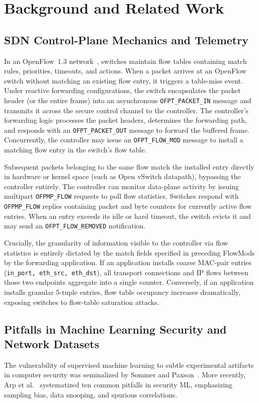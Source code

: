 \documentclass[journal]{IEEEtran}
\begin{document}
\section{Background and Related Work}\label{sec:relwork}
\subsection{SDN Control-Plane Mechanics and Telemetry}
In an OpenFlow~1.3 network~\cite{onf2012openflow13}, switches maintain flow tables containing match rules, priorities, timeouts, and actions. When a packet arrives at an OpenFlow switch without matching an existing flow entry, it triggers a table-miss event. Under reactive forwarding configurations, the switch encapsulates the packet header (or the entire frame) into an asynchronous \texttt{OFPT\_PACKET\_IN} message and transmits it across the secure control channel to the controller. The controller's forwarding logic processes the packet headers, determines the forwarding path, and responds with an \texttt{OFPT\_PACKET\_OUT} message to forward the buffered frame. Concurrently, the controller may issue an \texttt{OFPT\_FLOW\_MOD} message to install a matching flow entry in the switch's flow table.

Subsequent packets belonging to the same flow match the installed entry directly in hardware or kernel space (such as Open vSwitch datapath), bypassing the controller entirely. The controller can monitor data-plane activity by issuing multipart \texttt{OFPMP\_FLOW} requests to poll flow statistics. Switches respond with \texttt{OFPMP\_FLOW} replies containing packet and byte counters for currently active flow entries. When an entry exceeds its idle or hard timeout, the switch evicts it and may send an \texttt{OFPT\_FLOW\_REMOVED} notification. 

Crucially, the granularity of information visible to the controller via flow statistics is entirely dictated by the match fields specified in preceding FlowMods by the forwarding application. If an application installs coarse MAC-pair entries (\texttt{in\_port, eth\_src, eth\_dst}), all transport connections and IP flows between those two endpoints aggregate into a single counter. Conversely, if an application installs granular 5-tuple entries, flow table occupancy increases dramatically, exposing switches to flow-table saturation attacks.

\subsection{Pitfalls in Machine Learning Security and Network Datasets}
The vulnerability of supervised machine learning to subtle experimental artifacts in computer security was seminalized by Sommer and Paxson~\cite{sommer2010outside}. More recently, Arp et al.~\cite{arp2022dos} systematized ten common pitfalls in security ML, emphasizing sampling bias, data snooping, and spurious correlations.
\end{document}
